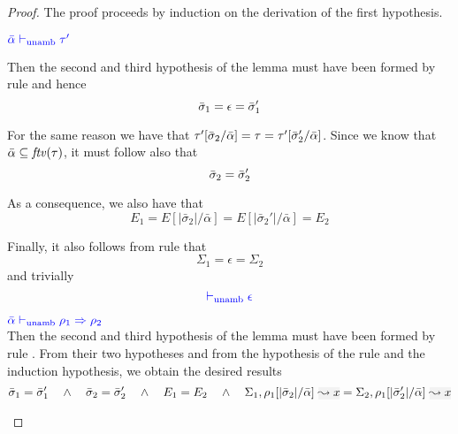 \begin{proof}
The proof proceeds by induction on the derivation of the first hypothesis.
\begin{description}
\setlength{\itemsep}{1em}
\item[\fbox{\rref{UA-Simp}}]\quad${\color{blue} \bar{\alpha} \vdash_{\mathrm{unamb}} \tau'}$

  Then the second and third hypothesis of the lemma must have been formed by rule 
  and hence 
\begin{equation*}
  \bar{\sigma}_1 = \epsilon = \bar{\sigma}_1'
\end{equation*}
  
  For the same reason we have that $\tau'[\bar{\sigma}_2/\bar{\alpha}] = \tau = \tau'[\bar{\sigma}_2'/\bar{\alpha}]$. Since we know that $\bar{\alpha} \subseteq \mathit{ftv}(\tau)$, it must follow also that
\begin{equation*}
  \bar{\sigma}_2 = \bar{\sigma}_2'
\end{equation*}

  As a consequence, we also have that
\begin{equation*}
  E_1 = E[|\bar{\sigma}_2|/\bar{\alpha}] = E[|\bar{\sigma}_2'|/\bar{\alpha}] = E_2
\end{equation*}

  Finally, it also follows from rule  that
\begin{equation*}
  \Sigma_1 = \epsilon = \Sigma_2
\end{equation*}
  and trivially
\begin{equation*}
  {\color{blue}  \vdash_{\mathrm{unamb}}\epsilon}
\end{equation*}

\item[\fbox{\rref{UA-IAbs}}]\quad${\color{blue} \bar{\alpha} \vdash_{\mathrm{unamb}} \rho_1 \Rightarrow \rho_2}$ \\

  Then the second and third hypothesis of the lemma must have been formed by rule .
  From their two hypotheses and from the hypothesis of the rule and the induction hypothesis, we obtain
  the desired results
\begin{equation*}
  \bar{\suty}_1 = \bar{\suty}_1' \quad\wedge\quad \bar{\suty}_2 = \bar{\suty}_2'
  \quad\wedge\quad 
  E_1 = E_2
  \quad\wedge\quad
  \Sigma_1,\ie{\rulet_1[|\bar{\sigma}_2|/\bar{\alpha}]}{x}
  = 
  \Sigma_2,\ie{\rulet_1[|\bar{\sigma}_2'|/\bar{\alpha}]}{x}
\end{equation*}


\end{description}
\end{proof}
